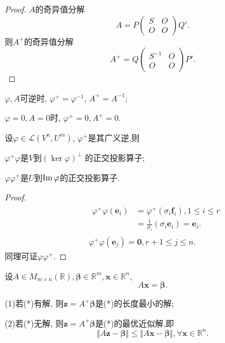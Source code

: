 \begin{proof}
  $A$的奇异值分解
  \[
    A=P\begin{pmatrix}
      S&O\\
      O&O
    \end{pmatrix}Q'.
  \]
  则$A^+$的奇异值分解
  \[
    A^+=Q\begin{pmatrix}
      S^{-1}&O\\
      O&O
    \end{pmatrix}P'.
  \]
\end{proof}

\begin{notice}
  \begin{asparaenum}[(1)]
  \item $\varphi, A$可逆时, $\varphi^+=\varphi^{-1}$,
    $A^+=A^{-1}$;
  \item $\varphi=0, A=0$时, $\varphi^+=0, A^+=0$.
  \end{asparaenum}
\end{notice}

\begin{theory}\label{thr:SVD1}
  设$\varphi\in\mathscr{L}(V^n,U^m)$,
  $\varphi^+$是其广义逆,则

  $\varphi^+\varphi$是$V$到$(\ker\varphi)^{\perp}$
  的正交投影算子;

  $\varphi\varphi^+$是$U$到$\operatorname{Im}\varphi$的正交投影算子.
\end{theory}

\begin{proof}
  \begin{align*}
    & \begin{aligned}
      \varphi^+\varphi(\bm{e}_i) & = \varphi^+(\sigma_i\bm{f}_i), 1 \leq i \leq r\\
      & = \frac{1}{\sigma_i}(\sigma_i\bm{e}_i) = \bm{e}_i.
    \end{aligned}\\
    & \varphi^+\varphi(\bm{e}_j) = \bm{0}, r+1\leq j \leq n.
  \end{align*}
  同理可证$\varphi\varphi^+$.
\end{proof}

\begin{theorem}\label{thm:SVD4}
  设$A\in M_{m\times n}(\mathbb{R}), \bm{\beta}\in\mathbb{R}^m,
  \bm{x}\in\mathbb{R}^n$,
  \begin{equation}\tag{*}
    A\bm{x}=\bm{\beta}.
  \end{equation}

  (1)若(*)有解, 则$\bm{z}=A^+\bm{\beta}$是(*)的长度最小的解;

  (2)若(*)无解, 则$\bm{z}=A^+\bm{\beta}$是(*)的最优近似解,即
  \[
    \Vert A\bm{z}-\bm{\beta}\Vert \leq \Vert A\bm{x}-\bm{\beta}\Vert,
    \forall \bm{x}\in\mathbb{R}^n.
  \]
\end{theorem}

